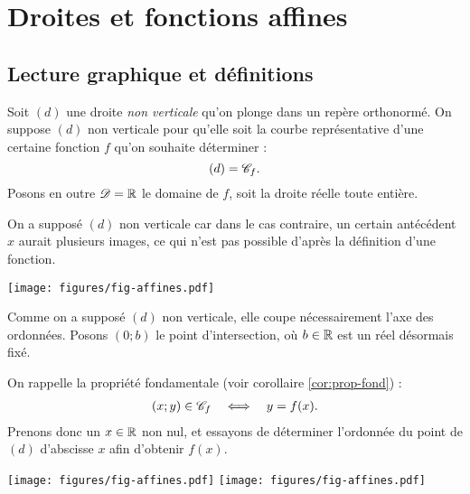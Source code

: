 
\chapter{Droites et fonctions affines}

\section{Lecture graphique et définitions}\label{sec:aff-1}

Soit $(d)$ une droite \emph{non verticale} qu'on plonge dans un repère orthonormé.
On suppose $(d)$ non verticale pour qu'elle soit la courbe représentative d'une certaine fonction $f$ qu'on souhaite déterminer : \[(d) = \mathcal{C}_f. \]
Posons en outre $\mathcal{D} = \mathbb{R}$ le domaine de $f$, soit la droite réelle toute entière.

On a supposé $(d)$ non verticale car dans le cas contraire, un certain antécédent $x$ aurait plusieurs images, ce qui n'est pas possible d'après la définition d'une fonction.


	\begin{center}
	\texttt{[image: figures/fig-affines.pdf]}
	\end{center}

Comme on a supposé $(d)$ non verticale, elle coupe nécessairement l'axe des ordonnées.
Posons $(0; b)$ le point d'intersection, où $b\in\mathbb{R}$ est un réel désormais fixé.

On rappelle la propriété fondamentale (voir corollaire \ref{cor:prop-fond}) : 
	\begin{align*}
		(x;y) \in \mathcal{C}_f && \iff && y = f(x).
	\end{align*}
Prenons donc un $x \in \mathbb{R}$ non nul, et essayons de déterminer l'ordonnée du point de $(d)$ d'abscisse $x$ afin d'obtenir $f(x)$.

	\begin{center}
	\texttt{[image: figures/fig-affines.pdf]}
	\hfill
	\texttt{[image: figures/fig-affines.pdf]}
	\end{center}
	
